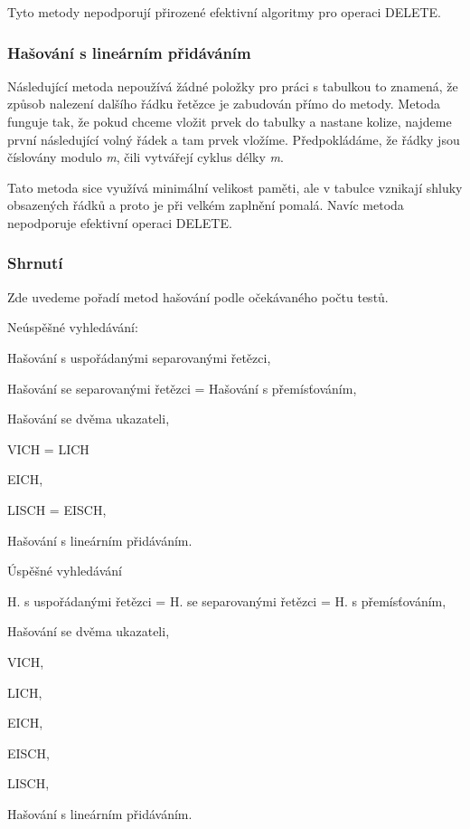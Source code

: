 Tyto metody nepodporují přirozené efektivní algoritmy pro operaci DELETE.

\subsubsection*{Hašování s lineárním přidáváním}

Následující metoda nepoužívá žádné položky pro práci s tabulkou to znamená, že
způsob nalezení dalšího řádku řetězce je zabudován přímo do metody. Metoda
funguje tak, že pokud chceme vložit prvek do tabulky a nastane kolize, najdeme
první následující volný řádek a tam prvek vložíme. Předpokládáme, že řádky jsou
číslovány modulo \emph{m}, čili vytvářejí cyklus délky \emph{m}.

Tato metoda sice využívá minimální velikost paměti, ale v tabulce vznikají
shluky obsazených řádků a proto je při velkém zaplnění pomalá. Navíc metoda
nepodporuje efektivní operaci DELETE.

\subsubsection*{Shrnutí}

Zde uvedeme pořadí metod hašování podle očekávaného počtu testů.

\begin{obecne}{Neúspěšné vyhledávání:}
\begin{penumerate}
\item Hašování s uspořádanými separovanými řetězci,
\item Hašování se separovanými řetězci = Hašování s přemísťováním,
\item Hašování se dvěma ukazateli,
\item VICH = LICH
\item EICH,
\item LISCH = EISCH,
\item Hašování s lineárním přidáváním.
\end{penumerate}
\end{obecne}

\begin{obecne}{Úspěšné vyhledávání}
\begin{penumerate}
\item H. s uspořádanými řetězci = H. se separovanými řetězci = H. s přemísťováním,
\item Hašování se dvěma ukazateli,
\item VICH,
\item LICH,
\item EICH,
\item EISCH,
\item LISCH,
\item Hašování s lineárním přidáváním.
\end{penumerate}
\end{obecne}


